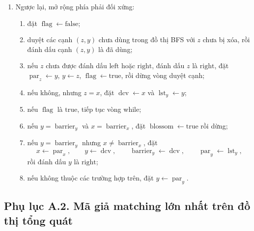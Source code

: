 \documentclass[11pt]{article}
\begin{document}
\begin{enumerate}
\begin{enumerate}
\begin{enumerate}
\[        \operatorname{par}_x\leftarrow \operatorname{lst}_x,
      \]
      rồi đánh dấu \(x\) là \(\mathrm{left}\);
      \item nếu không thuộc các trường hợp trên, đặt \(x\leftarrow\operatorname{par}_x\).
    \end{enumerate}
    \item Ngược lại, mở rộng phía phải đối xứng:
    \begin{enumerate}
      \item đặt \(\operatorname{flag}\leftarrow\mathrm{false}\);
      \item duyệt các cạnh \((z,y)\) chưa dùng trong đồ thị BFS với \(z\) chưa bị xóa,
      rồi đánh dấu cạnh \((z,y)\) là đã dùng;
      \item nếu \(z\) chưa được đánh dấu \(\mathrm{left}\) hoặc \(\mathrm{right}\),
      đánh dấu \(z\) là \(\mathrm{right}\), đặt
      \(\operatorname{par}_z\leftarrow y\), \(y\leftarrow z\),
      \(\operatorname{flag}\leftarrow\mathrm{true}\), rồi dừng vòng duyệt cạnh;
      \item nếu không, nhưng \(z=x\), đặt
      \(\operatorname{dcv}\leftarrow x\) và \(\operatorname{lst}_y\leftarrow y\);
      \item nếu \(\operatorname{flag}\) là \(\mathrm{true}\), tiếp tục vòng while;
      \item nếu \(y=\operatorname{barrier}_y\) và \(x=\operatorname{barrier}_x\),
      đặt \(\operatorname{blossom}\leftarrow\mathrm{true}\) rồi dừng;
      \item nếu \(y=\operatorname{barrier}_y\) nhưng \(x\ne\operatorname{barrier}_x\),
      đặt
      \[
        x\leftarrow \operatorname{par}_x,\qquad
        y\leftarrow \operatorname{dcv},\qquad
        \operatorname{barrier}_y\leftarrow \operatorname{dcv},\qquad
        \operatorname{par}_y\leftarrow \operatorname{lst}_y,
      \]
      rồi đánh dấu \(y\) là \(\mathrm{right}\);
      \item nếu không thuộc các trường hợp trên, đặt \(y\leftarrow\operatorname{par}_y\).
    \end{enumerate}
  \end{enumerate}
\end{enumerate}

\subsection*{Phụ lục A.2. Mã giả matching lớn nhất trên đồ thị tổng quát}
\end{document}

